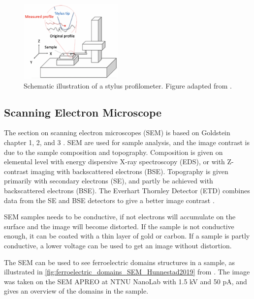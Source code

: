 \begin{figure}[ht]
    \centering
    \includegraphics[width=0.45\textwidth]{figures/profilometer.png}
    \caption{Schematic illustration of a stylus profilometer. Figure adapted from \cite{profilometer_manual}.}
    \label{fig:stylus_profilometer}
\end{figure}


\subsection{Scanning Electron Microscope}

\noindent The section on scanning electron microscopes (SEM) is based on Goldstein chapter 1, 2, and 3 \cite{goldstein_scanning_2018}.
SEM are used for sample analysis, and the image contrast is due to the sample composition and topography.
Composition is given on elemental level with energy dispersive X-ray spectroscopy (EDS), or with Z-contrast imaging with backscattered electrons (BSE).
Topography is given primarily with secondary electrons (SE), and partly be achieved with backscattered electrons (BSE).
The Everhart Thornley Detector (ETD) combines data from the SE and BSE detectors to give a better image contrast \cite{T_Everhart_1960}.


SEM samples needs to be conductive, if not electrons will accumulate on the surface and the image will become distorted.
If the sample is not conductive enough, it can be coated with a thin layer of gold or carbon.
If a sample is partly conductive, a lower voltage can be used to get an image without distortion.

The SEM can be used to see ferroelectric domains structures in a sample, as illustrated in \autoref{fig:ferroelectric_domains_SEM_Hunnestad2019} from \cite{hunnestad_visualizing_2019}.
The image was taken on the SEM APREO at NTNU NanoLab with 1.5 kV and 50 pA, and gives an overview of the domains in the sample.


